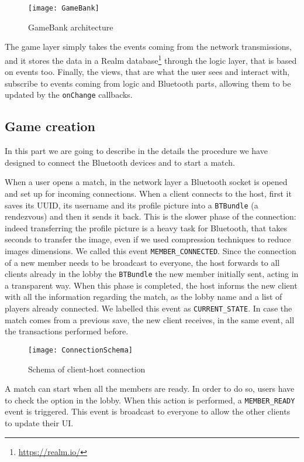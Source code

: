 \begin{figure}[t]
 \centering
 \texttt{[image: GameBank]}
 \caption{GameBank architecture}
 \label{fig:gbArchitecture}
\end{figure}

The game layer simply takes the events coming from the network transmissions, 
and it stores the data in a Realm database\footnote{\url{https://realm.io/}} 
through the logic layer, that is based on events too. Finally, the views, that 
are what the user sees and interact with, subscribe to events coming from logic 
and Bluetooth parts, allowing them to be updated by the \texttt{onChange} 
callbacks.

\subsection{Game creation}

In this part we are going to describe in the details the procedure we have 
designed to connect the Bluetooth devices and to start a match.

When a user opens a match, in the network layer a Bluetooth socket is opened 
and set up for incoming connections. When a client connects to the host, 
first it saves its UUID, its username and its profile picture into a 
\texttt{BTBundle} (a rendezvous) and then it sends it back.
This is the slower phase of the connection: indeed transferring the profile 
picture is a heavy task for Bluetooth, that takes seconds to transfer the image, 
even if we used compression techniques to reduce images dimensions. We called 
this event \texttt{MEMBER\_CONNECTED}. Since the connection of a new member 
needs to be broadcast to everyone, the host forwards to all clients 
already in the lobby the \texttt{BTBundle} the new member initially sent, acting 
in a transparent way. When this phase is completed, the host informs the new 
client with all the information regarding the match, as the lobby name and a 
list of players already connected. We labelled this event as 
\texttt{CURRENT\_STATE}. In case the match comes from a previous save, the new 
client receives, in the same event, all the transactions performed before.

\begin{figure}[t]
 \centering
 \texttt{[image: ConnectionSchema]}
 \caption{Schema of client-host connection}
 \label{fig:gbConnectionSchema}
\end{figure}

A match can start when all the members are ready. In order to do so, users have 
to check the option in the lobby. When this action is performed, a 
\texttt{MEMBER\_READY} event is triggered. This event is broadcast to everyone 
to allow the other clients to update their UI.

